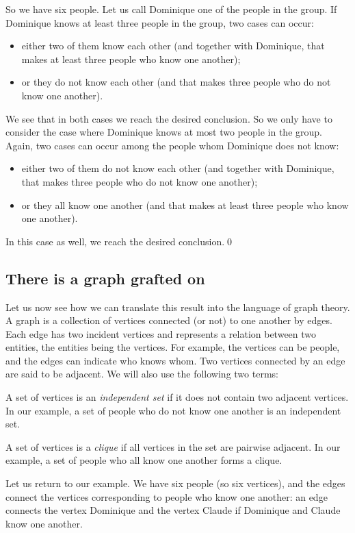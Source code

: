 \documentclass{amsart}
\begin{document}
So we have six people. Let us call Dominique%
one of the people in the group. If Dominique knows at least three
people in the group, two cases can occur:
\begin{itemize}
\item either two of them know each other (and together with Dominique,
  that makes at least three people who know one another);
\item or they do not know each other (and that makes three people who
  do not know one another).
\end{itemize}
We see that in both cases we reach the desired conclusion. So we only
have to consider the case where Dominique knows at most two people in
the group. Again, two cases can occur among the people whom Dominique
does not know:
\begin{itemize}
\item either two of them do not know each other (and together with
  Dominique, that makes three people who do not know one another);
\item or they all know one another (and that makes at least three
  people who know one another).
\end{itemize}
In this case as well, we reach the desired conclusion.\hfill\qed

\subsection{There is a graph grafted on}

Let us now see how we can translate this result into the language of
graph theory. A graph is a collection of vertices connected (or not)
to one another by edges. Each edge has two incident vertices and
represents a relation between two entities, the entities being the
vertices. For example, the vertices can be people, and the edges can
indicate who knows whom. Two vertices connected by an edge are said to
be adjacent. We will also use the following two terms:

A set of vertices is an \emph{independent set} if it does not contain
two adjacent vertices. In our example, a set of people who do not know
one another is an independent set.

A set of vertices is a \emph{clique} if all vertices in the set are
pairwise adjacent. In our example, a set of people who all know one
another forms a clique.

Let us return to our example. We have six people (so six vertices),
and the edges connect the vertices corresponding to people who know
one another: an edge connects the vertex Dominique and the vertex
Claude if Dominique and Claude know one another.%
\end{document}

